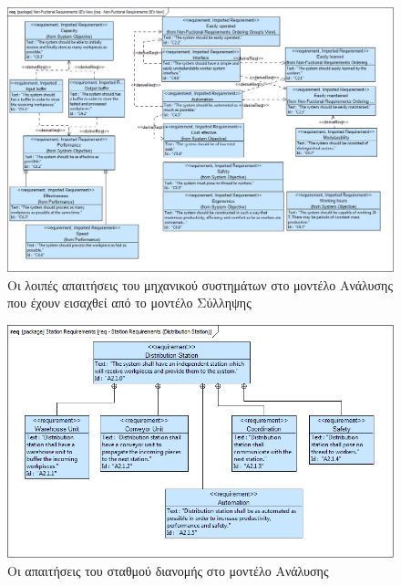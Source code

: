\documentclass[a4paper,12pt,twoside]{report}
\begin{document}
\begin{appendices}
			\begin{figure}[hp]
					\centering
					\includegraphics[scale=0.30]{AnalysisModel_req-Non-FuctionalRequirementsSEsView.png}
					\caption{Οι λοιπές απαιτήσεις του μηχανικού συστημάτων στο μοντέλο Ανάλυσης που έχουν εισαχθεί από το μοντέλο Σύλληψης}
					\label{φωτ:Οι λοιπές απαιτήσεις του μηχανικού συστημάτων στο μοντέλο Ανάλυσης που έχουν εισαχθεί από το μοντέλο Σύλληψης}
			\end{figure}
			
			\begin{figure}[hp]
					\centering
					\includegraphics[scale=0.30]{AnalysisModel_req-StationRequirements(DistributionStation).png}
					\caption{Οι απαιτήσεις του σταθμού διανομής στο μοντέλο Ανάλυσης}
					\label{φωτ:Οι απαιτήσεις του σταθμού διανομής στο μοντέλο Ανάλυσης}
			\end{figure}
			

\end{appendices}
\end{document}

